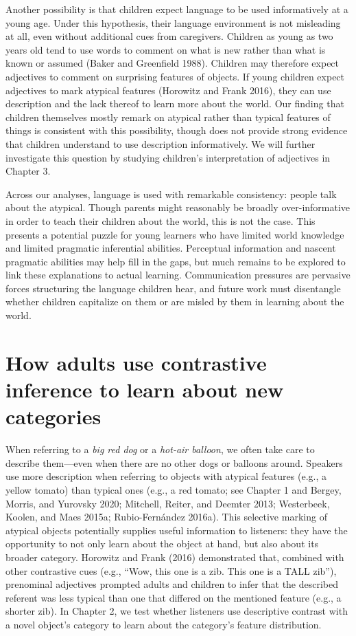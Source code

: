 \documentclass{ucetd}
\begin{document}
Another possibility is that children expect language to be used
informatively at a young age. Under this hypothesis, their language
environment is not misleading at all, even without additional cues from
caregivers. Children as young as two years old tend to use words to
comment on what is new rather than what is known or assumed (Baker and
Greenfield 1988). Children may therefore expect adjectives to comment on
surprising features of objects. If young children expect adjectives to
mark atypical features (Horowitz and Frank 2016), they can use
description and the lack thereof to learn more about the world. Our
finding that children themselves mostly remark on atypical rather than
typical features of things is consistent with this possibility, though
does not provide strong evidence that children understand to use
description informatively. We will further investigate this question by
studying children's interpretation of adjectives in Chapter 3.

Across our analyses, language is used with remarkable consistency:
people talk about the atypical. Though parents might reasonably be
broadly over-informative in order to teach their children about the
world, this is not the case. This presents a potential puzzle for young
learners who have limited world knowledge and limited pragmatic
inferential abilities. Perceptual information and nascent pragmatic
abilities may help fill in the gaps, but much remains to be explored to
link these explanations to actual learning. Communication pressures are
pervasive forces structuring the language children hear, and future work
must disentangle whether children capitalize on them or are misled by
them in learning about the world.

\hypertarget{how-adults-use-contrastive-inference-to-learn-about-new-categories}{%
\chapter{How adults use contrastive inference to learn about new
categories}\label{how-adults-use-contrastive-inference-to-learn-about-new-categories}}

When referring to a \emph{big red dog} or a \emph{hot-air balloon}, we
often take care to describe them---even when there are no other dogs or
balloons around. Speakers use more description when referring to objects
with atypical features (e.g., a yellow tomato) than typical ones (e.g.,
a red tomato; see Chapter 1 and Bergey, Morris, and Yurovsky 2020;
Mitchell, Reiter, and Deemter 2013; Westerbeek, Koolen, and Maes 2015a;
Rubio-Fernández 2016a). This selective marking of atypical objects
potentially supplies useful information to listeners: they have the
opportunity to not only learn about the object at hand, but also about
its broader category. Horowitz and Frank (2016) demonstrated that,
combined with other contrastive cues (e.g., ``Wow, this one is a zib.
This one is a TALL zib''), prenominal adjectives prompted adults and
children to infer that the described referent was less typical than one
that differed on the mentioned feature (e.g., a shorter zib). In Chapter
2, we test whether listeners use descriptive contrast with a novel
object's category to learn about the category's feature distribution.
\end{document}
